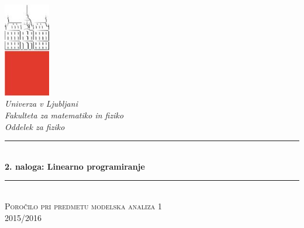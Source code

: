 \documentclass[slovene,11pt,a4paper]{article}
\numberwithin{equation}{section} %
\numberwithin{figure}{section} %
\numberwithin{table}{section} %
\begin{document}
\begin{titlepage}

\newcommand{\HRule}{\rule{\linewidth}{0.5mm}} %

\center %


 

\includegraphics[width=2cm]{slike/aaa}\\[0.5cm]
 
\textit{Univerza v Ljubljani}\\
\textit{Fakulteta za {\color{red}matematiko in fiziko}}\\[0.5cm]

\emph{Oddelek za fiziko}\\[0.5cm] %


\HRule \\[0.4cm]
\huge {\bfseries 2. naloga: Linearno programiranje}\\[0.4cm] %
\HRule \\[0.5cm] 

 \textsc{\large Poročilo pri predmetu modelska analiza 1}\\
 \textsc{\large 2015/2016}\\[1cm] %
 

\end{titlepage}
\end{document}
